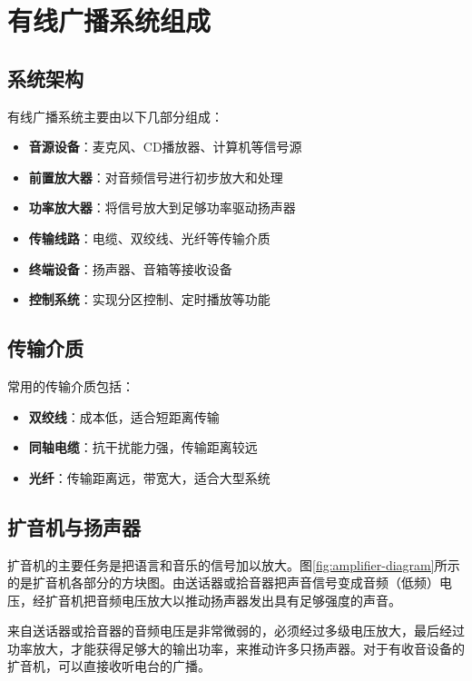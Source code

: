 \documentclass[12pt,UTF8]{ctexbook}
\begin{document}
\chapter{有线广播系统组成}

\section{系统架构}

有线广播系统主要由以下几部分组成：

\begin{itemize}[leftmargin=3.5em]
    \item \textbf{音源设备}：麦克风、CD播放器、计算机等信号源
    \item \textbf{前置放大器}：对音频信号进行初步放大和处理
    \item \textbf{功率放大器}：将信号放大到足够功率驱动扬声器
    \item \textbf{传输线路}：电缆、双绞线、光纤等传输介质
    \item \textbf{终端设备}：扬声器、音箱等接收设备
    \item \textbf{控制系统}：实现分区控制、定时播放等功能
\end{itemize}

\section{传输介质}

常用的传输介质包括：

\begin{itemize}[leftmargin=3.5em]
    \item \textbf{双绞线}：成本低，适合短距离传输
    \item \textbf{同轴电缆}：抗干扰能力强，传输距离较远
    \item \textbf{光纤}：传输距离远，带宽大，适合大型系统
\end{itemize}

\section{扩音机与扬声器}

扩音机的主要任务是把语言和音乐的信号加以放大。图\ref{fig:amplifier-diagram}所示的是扩音机各部分的方块图。由送话器或拾音器把声音信号变成音频（低频）电压，经扩音机把音频电压放大以推动扬声器发出具有足够强度的声音。

来自送话器或拾音器的音频电压是非常微弱的，必须经过多级电压放大，最后经过功率放大，才能获得足够大的输出功率，来推动许多只扬声器。对于有收音设备的扩音机，可以直接收听电台的广播。
\end{document}
